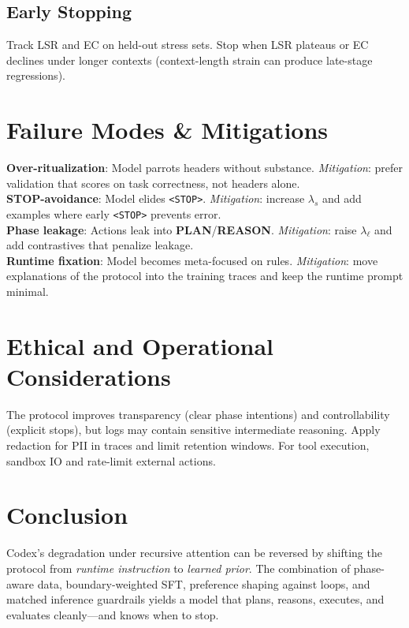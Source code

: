 \documentclass[11pt]{article}
\begin{document}
\subsection*{Early Stopping}
Track LSR and EC on held-out stress sets. Stop when LSR plateaus or EC declines under longer contexts (context-length strain can produce late-stage regressions).

\section{Failure Modes \& Mitigations}
\textbf{Over-ritualization}: Model parrots headers without substance. \emph{Mitigation}: prefer validation that scores on task correctness, not headers alone.\\
\textbf{STOP-avoidance}: Model elides \texttt{<STOP>}. \emph{Mitigation}: increase $\lambda_s$ and add examples where early \texttt{<STOP>} prevents error.\\
\textbf{Phase leakage}: Actions leak into \textbf{PLAN}/\textbf{REASON}. \emph{Mitigation}: raise $\lambda_\ell$ and add contrastives that penalize leakage.\\
\textbf{Runtime fixation}: Model becomes meta-focused on rules. \emph{Mitigation}: move explanations of the protocol into the training traces and keep the runtime prompt minimal.

\section{Ethical and Operational Considerations}
The protocol improves transparency (clear phase intentions) and controllability (explicit stops),
but logs may contain sensitive intermediate reasoning. Apply redaction for PII in traces and limit retention windows. For tool execution, sandbox IO and rate-limit external actions.

\section{Conclusion}
Codex's degradation under recursive attention can be reversed by shifting the protocol from
\emph{runtime instruction} to \emph{learned prior}. The combination of phase-aware data,
boundary-weighted SFT, preference shaping against loops, and matched inference guardrails
yields a model that plans, reasons, executes, and evaluates cleanly---and knows when to stop.

\appendix
\end{document}

